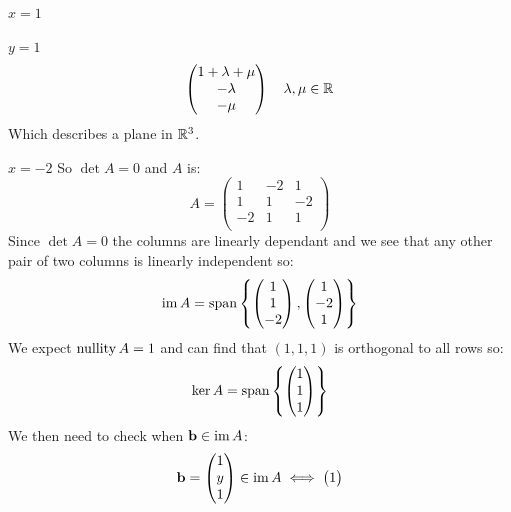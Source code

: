 \documentclass[../main.tex]{subfiles}
\begin{document}
\begin{example}
\begin{proofcases}
\begin{case}{$x = 1$}
\begin{proofcases}
\begin{case}{$y = 1$}
\[\begin{pmatrix}
            1 + \lambda + \mu \\
            -\lambda \\
            -\mu \\
            \end{pmatrix} \quad \lambda, \mu \in \mathbb{R}
          \]
          Which describes a plane in $\mathbb{R}^3$.
        \end{case}
      \end{proofcases}
    \end{case}
    \begin{case}{$x = -2$}
      So $\det A = 0$ and $A$ is:
      \[
        A = \begin{pmatrix}
        1 & -2 & 1 \\
        1 & 1 & -2 \\
        -2 & 1 & 1 \\
        \end{pmatrix}
      \]
      Since $\det A = 0$ the columns are linearly dependant and we see that any other pair of two columns is linearly independent so:
      \[
        \operatorname{im} A = \operatorname{span}\left\{\begin{pmatrix}
        1 \\
        1 \\
        -2 \\
        \end{pmatrix},
        \begin{pmatrix}
        1 \\
        -2 \\
        1 \\
        \end{pmatrix}\right\}
      \]
      We expect $\operatorname{nullity} A = 1$ and can find that $(1, 1, 1)$ is orthogonal to all rows so:
      \[
        \ker A = \operatorname{span}\left\{\begin{pmatrix}
        1 \\
        1 \\
        1 \\
        \end{pmatrix}\right\}
      \]
      We then need to check when $\mathbf{\bm{b}} \in \operatorname{im} A$:
      \[
        \mathbf{\bm{b}} = \begin{pmatrix}
        1 \\
        y \\
        1 \\
        \end{pmatrix} \in \operatorname{im} A \iff
        \begin{pmatrix}
        1 \\

\end{pmatrix}\]
\end{case}
\end{proofcases}
\end{example}
\end{document}
